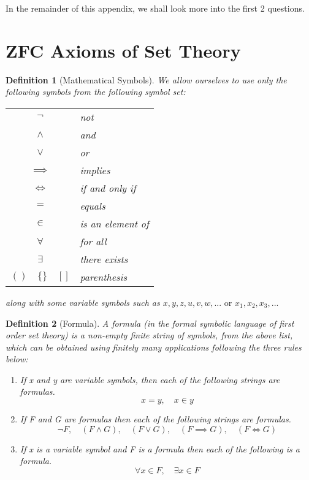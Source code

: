 \documentclass[11pt, oneside]{book}
\theoremstyle{break}
\newtheorem{defn}{Definition}[section]
\begin{document}
In the remainder of this appendix, we shall look more into the first 2 questions.


\section{ZFC Axioms of Set Theory}

\begin{defn}[Mathematical Symbols]
	We allow ourselves to use only the following symbols from the following symbol set: \\
	\begin{center}
		\begin{tabular}{c l}
			$\neg$		&	not \\
			$\land$		&	and \\
			$\lor$		&	or \\
			$\implies$	&	implies \\
			$\iff$	&	if and only if \\
			$=$			&	equals \\
			$\in$		&	is an element of \\
			$\forall$	&	for all \\
			$\exists$	&	there exists \\
			$()\quad\{\}\quad[]$	&	parenthesis
		\end{tabular}
	\end{center}
	along with some variable symbols such as $x, y, z, u, v, w,... \text{ or } x_1, x_2, x_3,...$
\end{defn}

\begin{defn}[Formula]
	A formula (in the formal symbolic language of first order set theory) is a non-empty finite string of symbols, from the above list, which can be obtained using finitely many applications following the three rules below:
	\begin{enumerate}
		\item If x and y are variable symbols, then each of the following strings are formulas.
		\[
			x = y, \quad x \in y
		\]
		\item If F and G are formulas then each of the following strings are formulas.
		\[
			\neg F, \quad (F \land G), \quad (F \lor G), \quad (F \implies G), \quad (F \iff G)
		\]
		\item If x is a variable symbol and F is a formula then each of the following is a formula.
		\[
			\forall x \in F, \quad \exists x \in F
		\]
	\end{enumerate}
\end{defn}
\end{document}

